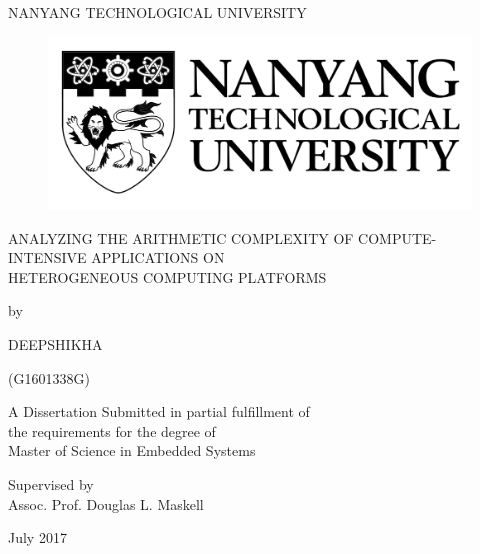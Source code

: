 \begin{titlepage}
\begin{center}
{\LARGE {NANYANG TECHNOLOGICAL UNIVERSITY}}
\begin{figure}[!t]
\centering
\includegraphics[width= 8 cm]{figures/ntulogo.pdf}
\end{figure} 
\vspace*{0.7in}
{\large ANALYZING THE ARITHMETIC COMPLEXITY OF COMPUTE-INTENSIVE APPLICATIONS ON \\ HETEROGENEOUS COMPUTING PLATFORMS}
\par
\vspace{0.4 in}
{\large by\\}
\vspace{0.2 in}
{\large DEEPSHIKHA

(G1601338G)}
\vspace{0.1 in}
\par
\vfill
A Dissertation Submitted in partial fulfillment of \\ the requirements for the degree of \\ Master of Science in Embedded Systems
\par
\vspace{0.4in}
Supervised by\\
\vspace{0.1in}
{\large Assoc. Prof. Douglas L. Maskell \\}
\par
\vspace{0.15in}
July 2017
\end{center}
\end{titlepage}